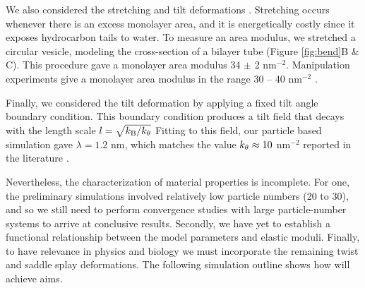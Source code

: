 We also considered the stretching and tilt deformations \cite{Fu2018_SIAM}. 
Stretching occurs whenever there is an excess monolayer area,
and it is energetically costly since it exposes hydrocarbon tails to water.
To measure an area modulus, we stretched a circular vesicle, modeling the cross-section 
of a bilayer tube (Figure \ref{fig:bend}B \& C).
This procedure gave a monolayer area modulus 
34 $\pm$ 2 \kBT \;nm$^{-2}$. Manipulation experiments give a monolayer area modulus in the range 
30 -- 40 \kBT\; nm$^{-2}$ \cite{Nagle17, Nagle17-2}. 

Finally, we considered the tilt deformation by applying a fixed tilt angle boundary condition. 
This boundary condition produces a tilt field that decays with the length scale $l = \sqrt{k_{\mathrm{B}}/k_{\theta}}$ 
Fitting to this field, our particle based simulation gave $\lambda = 1.2$ nm, which matches
the value $k_{\theta} \approx 10$ \kBT \; nm$^{-2}$ reported in the literature \cite{KUZMIN2005, KoNa15}.



Nevertheless, the characterization of material properties is incomplete. For one, the preliminary simulations involved relatively low particle numbers (20 to 30), and so we still need to
perform convergence studies with large particle-number systems to arrive at conclusive results. Secondly, we have yet to establish a functional
relationship between the model parameters and elastic moduli.
Finally, to have relevance in physics and biology we must incorporate the remaining twist and saddle splay deformations.
The following simulation outline shows how will achieve aims.

